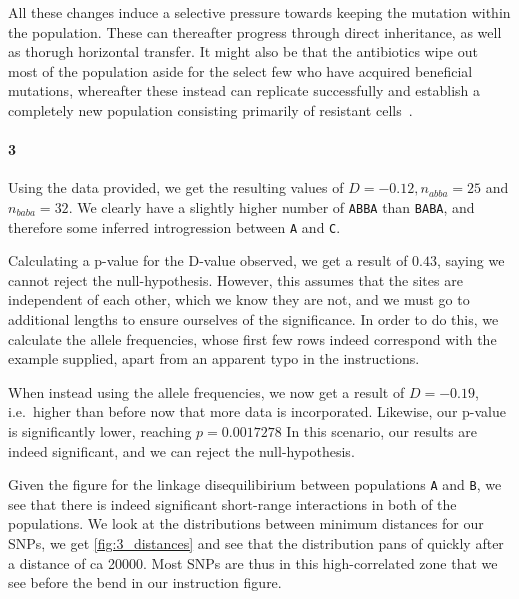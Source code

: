 \documentclass[10pt]{article}\usepackage[]{graphicx}\usepackage[]{color}
\theoremstyle{plain}
\newcommand{\ABBA}{\texttt{ABBA}\xspace}
\newcommand{\BABA}{\texttt{BABA}\xspace}
\newcommand{\A}{\texttt{A}\xspace}
\newcommand{\B}{\texttt{B}\xspace}
\renewcommand{\C}{\texttt{C}\xspace}
\begin{document}
\begin{multicols*}{2}
All these changes induce a selective pressure towards keeping the mutation within the population. These can thereafter progress through direct inheritance, as well as thorugh horizontal transfer. It might also be that the antibiotics wipe out most of the population aside for the select few who have acquired beneficial mutations, whereafter these instead can replicate successfully and establish a completely new population consisting primarily of resistant cells~\cite{martinez2000mutation}.

\paragraph*{3}

Using the data provided, we get the resulting values of $D = -0.12, n_{abba} = 25$ and $n_{baba} = 32$. We clearly have a slightly higher number of \ABBA than \BABA, and therefore some inferred introgression between \A and \C. 

Calculating a p-value for the D-value observed, we get a result of $0.43$, saying we cannot reject the null-hypothesis. However, this assumes that the sites are independent of each other, which we know they are not, and we must go to additional lengths to ensure ourselves of the significance. In order to do this, we calculate the allele frequencies, whose first few rows indeed correspond with the example supplied, apart from an apparent typo in the instructions.

When instead using the allele frequencies, we now get a result of $D = -0.19$, i.e.\ higher than before now that more data is incorporated. Likewise, our p-value is significantly lower, reaching $p = 0.0017278$ In this scenario, our results are indeed significant, and we can reject the null-hypothesis. 

Given the figure for the linkage disequilibirium between populations \A and \B, we see that there is indeed significant short-range interactions in both of the populations. We look at the distributions between minimum distances for our SNPs, we get \cref{fig:3_distances} and see that the distribution pans of quickly after a distance of ca 20000. Most SNPs are thus in this high-correlated zone that we see before the bend in our instruction figure. 

\begin{Schunk}
\begin{figure}[H]


\end{figure}
\end{Schunk}
\end{multicols*}
\end{document}
